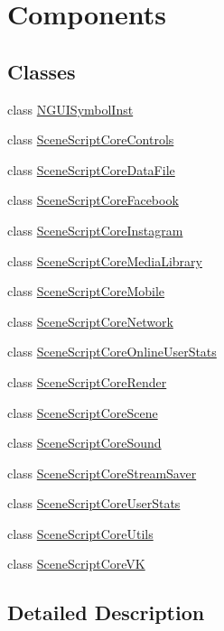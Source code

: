 \hypertarget{group__gr__scriptcore__parts}{}\section{Components}
\label{group__gr__scriptcore__parts}
\subsection*{Classes}
\begin{DoxyCompactItemize}
\item 
class \hyperlink{class_n_g_u_i_symbol_inst}{N\+G\+U\+I\+Symbol\+Inst}
\item 
class \hyperlink{class_scene_script_core_controls}{Scene\+Script\+Core\+Controls}
\item 
class \hyperlink{class_scene_script_core_data_file}{Scene\+Script\+Core\+Data\+File}
\item 
class \hyperlink{class_scene_script_core_facebook}{Scene\+Script\+Core\+Facebook}
\item 
class \hyperlink{class_scene_script_core_instagram}{Scene\+Script\+Core\+Instagram}
\item 
class \hyperlink{class_scene_script_core_media_library}{Scene\+Script\+Core\+Media\+Library}
\item 
class \hyperlink{class_scene_script_core_mobile}{Scene\+Script\+Core\+Mobile}
\item 
class \hyperlink{class_scene_script_core_network}{Scene\+Script\+Core\+Network}
\item 
class \hyperlink{class_scene_script_core_online_user_stats}{Scene\+Script\+Core\+Online\+User\+Stats}
\item 
class \hyperlink{class_scene_script_core_render}{Scene\+Script\+Core\+Render}
\item 
class \hyperlink{class_scene_script_core_scene}{Scene\+Script\+Core\+Scene}
\item 
class \hyperlink{class_scene_script_core_sound}{Scene\+Script\+Core\+Sound}
\item 
class \hyperlink{class_scene_script_core_stream_saver}{Scene\+Script\+Core\+Stream\+Saver}
\item 
class \hyperlink{class_scene_script_core_user_stats}{Scene\+Script\+Core\+User\+Stats}
\item 
class \hyperlink{class_scene_script_core_utils}{Scene\+Script\+Core\+Utils}
\item 
class \hyperlink{class_scene_script_core_v_k}{Scene\+Script\+Core\+VK}
\end{DoxyCompactItemize}


\subsection{Detailed Description}
